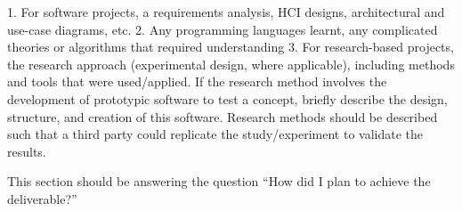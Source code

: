 1. For software projects, a requirements analysis, HCI designs, architectural
and use-case diagrams, etc.
2. Any programming languages learnt, any complicated theories or algorithms
that required understanding
3. For research-based projects, the research approach (experimental design,
where applicable), including methods and tools that were used/applied. If the
research method involves the development of prototypic software to test a
concept, briefly describe the design, structure, and creation of this software.
Research methods should be described such that a third party could replicate
the study/experiment to validate the results.

This section should be answering the question “How did I plan to achieve the
deliverable?”
